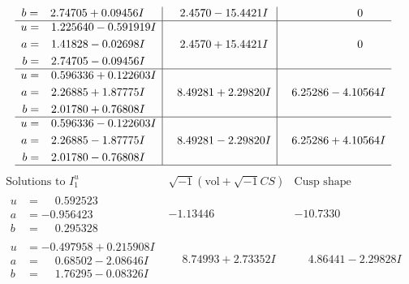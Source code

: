 \documentclass[1p]{elsarticle_modified}
\theoremstyle{definition}
\newcommand{\I}{\sqrt{-1}}
\begin{document}
$$\begin{array}{c|c|c}
\begin{aligned}
b &= \phantom{-}2.74705 + 0.09456 I\end{aligned}
 & \phantom{-}2.4570 - 15.4421 I & \phantom{-0.000000 } 0 \\ \hline\begin{aligned}
u &= \phantom{-}1.225640 - 0.591919 I \\
a &= \phantom{-}1.41828 - 0.02698 I \\
b &= \phantom{-}2.74705 - 0.09456 I\end{aligned}
 & \phantom{-}2.4570 + 15.4421 I & \phantom{-0.000000 } 0 \\ \hline\begin{aligned}
u &= \phantom{-}0.596336 + 0.122603 I \\
a &= \phantom{-}2.26885 + 1.87775 I \\
b &= \phantom{-}2.01780 + 0.76808 I\end{aligned}
 & \phantom{-}8.49281 + 2.29820 I & \phantom{-}6.25286 - 4.10564 I \\ \hline\begin{aligned}
u &= \phantom{-}0.596336 - 0.122603 I \\
a &= \phantom{-}2.26885 - 1.87775 I \\
b &= \phantom{-}2.01780 - 0.76808 I\end{aligned}
 & \phantom{-}8.49281 - 2.29820 I & \phantom{-}6.25286 + 4.10564 I\\
 \hline 
 \end{array}$$\newpage$$\begin{array}{c|c|c}  
\text{Solutions to }I^u_{1}& \I (\text{vol} + \sqrt{-1}CS) & \text{Cusp shape}\\
 \hline 
\begin{aligned}
u &= \phantom{-}0.592523\phantom{ +0.000000I} \\
a &= -0.956423\phantom{ +0.000000I} \\
b &= \phantom{-}0.295328\phantom{ +0.000000I}\end{aligned}
 & -1.13446\phantom{ +0.000000I} & -10.7330\phantom{ +0.000000I} \\ \hline\begin{aligned}
u &= -0.497958 + 0.215908 I \\
a &= \phantom{-}0.68502 - 2.08646 I \\
b &= \phantom{-}1.76295 - 0.08326 I\end{aligned}
 & \phantom{-}8.74993 + 2.73352 I & \phantom{-}4.86441 - 2.29828 I \\ \hline\begin{aligned}

\end{aligned}
\end{array}$$
\end{document}

